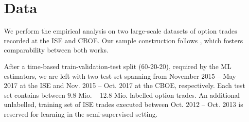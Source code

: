 









\section{Data}


We perform the empirical analysis on two large-scale datasets of option trades recorded at the \gls{ISE} and \gls{CBOE}. Our sample construction follows \textcite[][]{grauerOptionTradeClassification2022}, which fosters comparability between both works. 

After a time-based train-validation-test split (60-20-20), required by the \gls{ML} estimators, we are left with two test set spanning from November 2015 -- May 2017 at the \gls{ISE} and Nov. 2015 -- Oct. 2017 at the \gls{CBOE}, respectively. Each test set contains between 9.8 Mio. --  12.8 Mio. labelled option trades. An additional unlabelled, training set of \gls{ISE} trades executed between Oct. 2012 -- Oct. 2013 is reserved for learning in the semi-supervised setting.

